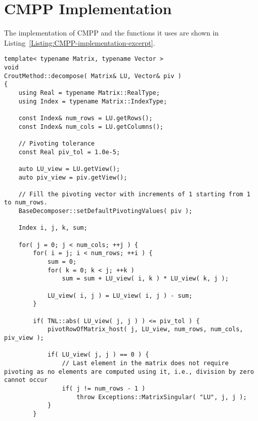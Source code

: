 \newpage 									%
\appendix

\chapter{CMPP Implementation}\label{Appendix:CMPP-implementation}
The implementation of CMPP and the functions it uses are shown in Listing~\ref{Listing:CMPP-implementation-excerpt}.

\begin{lstlisting}[caption={Excerpt from the implementation of CMPP.
The \code{pivotRowOfMatrix\_host()} function, presented below the \code{decompose()} method, is implemented in the parent class of \code{CroutMethod}: \code{BaseDecomposer}.
Note that the code has been slightly modified for brevity.
For example, the \code{swapRows\_host()} function has been omitted as it is a basic operation, and the checks for appropriate sizing of matrices/vectors have been removed.},label={Listing:CMPP-implementation-excerpt}]
template< typename Matrix, typename Vector >
void
CroutMethod::decompose( Matrix& LU, Vector& piv )
{
	using Real = typename Matrix::RealType;
	using Index = typename Matrix::IndexType;
	
	const Index& num_rows = LU.getRows();
	const Index& num_cols = LU.getColumns();
	
	// Pivoting tolerance
	const Real piv_tol = 1.0e-5;
	
	auto LU_view = LU.getView();
	auto piv_view = piv.getView();
	
	// Fill the pivoting vector with increments of 1 starting from 1 to num_rows.
	BaseDecomposer::setDefaultPivotingValues( piv );
	
	Index i, j, k, sum;
	
	for( j = 0; j < num_cols; ++j ) {
		for( i = j; i < num_rows; ++i ) {
			sum = 0;
			for( k = 0; k < j; ++k )
				sum = sum + LU_view( i, k ) * LU_view( k, j );
			
			LU_view( i, j ) = LU_view( i, j ) - sum;
		}
		
		if( TNL::abs( LU_view( j, j ) ) <= piv_tol ) {
			pivotRowOfMatrix_host( j, LU_view, num_rows, num_cols, piv_view );
			
			if( LU_view( j, j ) == 0 ) {
				// Last element in the matrix does not require pivoting as no elements are computed using it, i.e., division by zero cannot occur
				if( j != num_rows - 1 )
					throw Exceptions::MatrixSingular( "LU", j, j );
			}
		}
		

\end{lstlisting}
